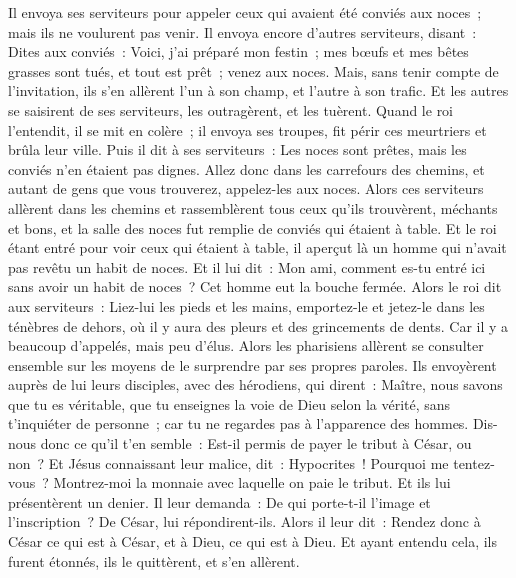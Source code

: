 \begin{multicols}{2}
Il envoya ses serviteurs pour appeler ceux qui avaient été conviés aux noces~; mais ils ne voulurent pas venir.
Il envoya encore d'autres serviteurs, disant~: Dites aux conviés~: Voici, j'ai préparé mon festin~; mes bœufs et mes bêtes grasses sont tués, et tout est prêt~; venez aux noces.
Mais, sans tenir compte de l'invitation, ils s'en allèrent l'un à son champ, et l'autre à son trafic.
Et les autres se saisirent de ses serviteurs, les outragèrent, et les tuèrent.
Quand le roi l'entendit, il se mit en colère~; il envoya ses troupes, fit périr ces meurtriers et brûla leur ville.
Puis il dit à ses serviteurs~: Les noces sont prêtes, mais les conviés n'en étaient pas dignes.
Allez donc dans les carrefours des chemins, et autant de gens que vous trouverez, appelez-les aux noces.
Alors ces serviteurs allèrent dans les chemins et rassemblèrent tous ceux qu'ils trouvèrent, méchants et bons, et la salle des noces fut remplie de conviés qui étaient à table.
Et le roi étant entré pour voir ceux qui étaient à table, il aperçut là un homme qui n'avait pas revêtu un habit de noces.
Et il lui dit~: Mon ami, comment es-tu entré ici sans avoir un habit de noces~? Cet homme eut la bouche fermée.
Alors le roi dit aux serviteurs~: Liez-lui les pieds et les mains, emportez-le et jetez-le dans les ténèbres de dehors, où il y aura des pleurs et des grincements de dents.
Car il y a beaucoup d'appelés, mais peu d'élus.
Alors les pharisiens allèrent se consulter ensemble sur les moyens de le surprendre par ses propres paroles.
Ils envoyèrent auprès de lui leurs disciples, avec des hérodiens, qui dirent~: Maître, nous savons que tu es véritable, que tu enseignes la voie de Dieu selon la vérité, sans t'inquiéter de personne~; car tu ne regardes pas à l'apparence des hommes.
Dis-nous donc ce qu'il t'en semble~: Est-il permis de payer le tribut à César, ou non~?
Et Jésus connaissant leur malice, dit~: Hypocrites~! Pourquoi me tentez-vous~?
Montrez-moi la monnaie avec laquelle on paie le tribut. Et ils lui présentèrent un denier.
Il leur demanda~: De qui porte-t-il l'image et l'inscription~?
De César, lui répondirent-ils. Alors il leur dit~: Rendez donc à César ce qui est à César, et à Dieu, ce qui est à Dieu.
Et ayant entendu cela, ils furent étonnés, ils le quittèrent, et s'en allèrent.

\end{multicols}

